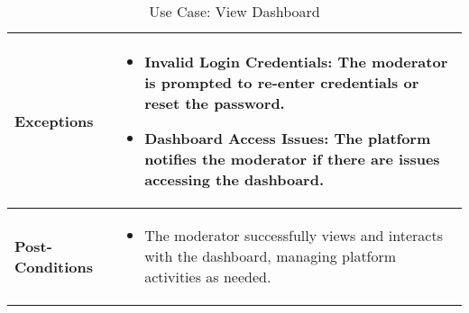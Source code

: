 \begin{table}[!ht]
\begin{tabularx}{\textwidth}{|l|X|}
        \hline
        \textbf{Exceptions} & 
        \begin{itemize}[label=--,itemsep=0pt]
            \item Invalid Login Credentials: The moderator is prompted to re-enter credentials or reset the password.
            \item Dashboard Access Issues: The platform notifies the moderator if there are issues accessing the dashboard.
        \end{itemize} \\
        \hline
        \textbf{Post-Conditions} & 
        \begin{itemize}[label=--,itemsep=0pt]
            \item The moderator successfully views and interacts with the dashboard, managing platform activities as needed.
        \end{itemize} \\
        \hline
    \end{tabularx}
    \caption{Use Case: View Dashboard}
    \label{tab:use-case-view-dashboard}
\end{table}


